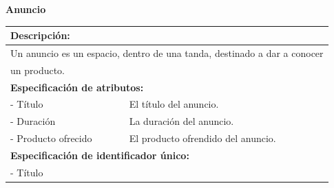 \documentclass[a4paper,10pt]{article}
\begin{document}
    \begin{flushleft}
      \begin{large} \bf{Anuncio} \end{large}
    \end{flushleft}
      \begin{tabular}{| p{2cm} | p{9cm} |}
	\hline
	\multicolumn{2}{|l|}{\bf{Descripci\'on:}} \\
	\hline
	\multicolumn{2}{|l|}{Un anuncio es un espacio, dentro de una tanda, destinado a dar a conocer} \\
	\multicolumn{2}{|l|}{un producto.} \\
	\hline	
	\hline	
	\multicolumn{2}{|l|}{\bf{Especificaci\'on de atributos:}} \\
	\hline
	- T\'itulo & El t\'itulo del anuncio. \\
	\hline \hline
	- Duraci\'on & La duraci\'on del anuncio. \\
	\hline \hline
	- Producto \newline ofrecido & El producto ofrendido del anuncio. \\
	\hline
	\multicolumn{2}{|l|}{\bf{Especificaci\'on de identificador \'unico:}} \\
	\hline
	\multicolumn{2}{|l|}{- T\'itulo} \\
	\hline
      \end{tabular}
\end{document}

